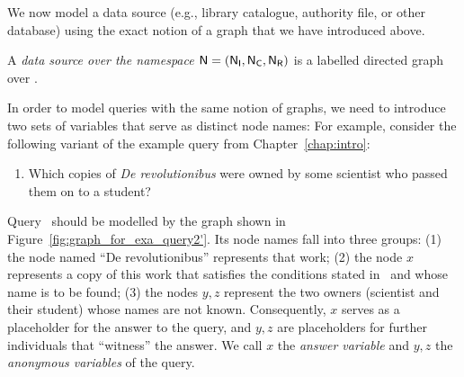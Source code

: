 We now model a data source (e.g., library catalogue, authority file, or other database)
using the exact notion of a graph that we have introduced above.
%
\begin{definition}
  A \emph{data source over the namespace $\textup{\textsf{N}}=(\mathsf{N}_\mathsf{I},\mathsf{N}_\mathsf{C},\mathsf{N}_\mathsf{R})$} is a labelled directed graph
  over \namespace.
\end{definition}
%
%
In order to model queries with the same notion of graphs, we need to introduce
two sets of variables that serve as distinct node names:
For example, consider the following variant of the example query  from Chapter~\ref{chap:intro}:
%
\begin{enumerate}
  \item[\exaquery{2$'$}]
    Which copies of \emph{De revolutionibus} were owned by some scientist who passed them on to a student?
\end{enumerate}
%
Query~
should be modelled by the graph shown in Figure~\ref{fig:graph_for_exa_query2'}.
Its node names fall into three groups:
(1) the node named ``De revolutionibus'' represents that work;
(2) the node $x$ represents a copy of this work that satisfies the conditions stated in~ and
whose name is to be found;
(3) the nodes $y,z$ represent the two owners (scientist and their student) whose names are not known.
Consequently, $x$ serves as a placeholder for the answer to the query,
and $y,z$ are placeholders for further individuals that ``witness'' the answer.
We call $x$ the \emph{answer variable} and $y,z$ the \emph{anonymous variables}
of the query.

